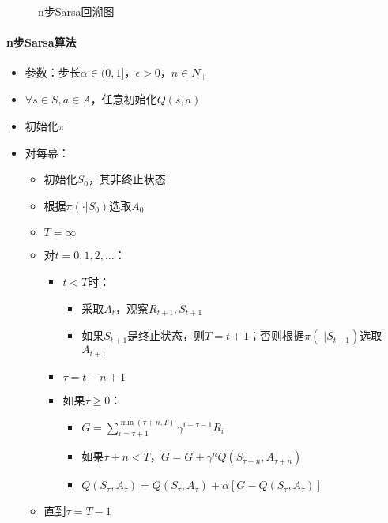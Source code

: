 \documentclass[
12pt, %
a4paper, 
oneside, %
headinclude,footinclude, %
]{scrartcl}
\begin{document}
\begin{figure}[H]
\centering
{} \\
\caption[n步Sarsa回溯图]{n步Sarsa回溯图}
\end{figure}
\paragraph{n步Sarsa算法}
\begin{itemize}
\item 参数：步长$ \alpha \in (0,1] $，$ \epsilon > 0 $，$ n \in N_+ $
\item $ \forall s \in S, a \in A $，任意初始化$ Q(s, a) $
\item 初始化$ \pi $
\item 对每幕：
\begin{itemize}
\item 初始化$ S_0 $，其非终止状态
\item 根据$ \pi(\cdot|S_0) $选取$ A_0 $
\item $ T = \infty $
\item 对$ t = 0, 1, 2, \dots $：
\begin{itemize}
\item $ t < T $时：
\begin{itemize}
\item 采取$ A_t $，观察$ R_{t + 1}, S_{t + 1} $
\item 如果$ S_{t + 1} $是终止状态，则$ T = t + 1 $；否则根据$ \pi(\cdot|S_{t + 1}) $选取$ A_{t + 1} $
\end{itemize}
\item $ \tau = t - n + 1 $
\item 如果$ \tau \geq 0 $：
\begin{itemize}
\item $ G = \sum_{i = \tau + 1}^{\min(\tau + n, T)} \gamma^{i - \tau - 1}R_i $
\item 如果$ \tau + n < T $，$ G = G + \gamma^n Q(S_{\tau + n}, A_{\tau + n}) $
\item $ Q(S_{\tau},A_{\tau}) = Q(S_{\tau},A_{\tau}) + \alpha[G - Q(S_{\tau},A_{\tau})] $
\end{itemize}
\end{itemize}
\item 直到$ \tau = T - 1 $
\end{itemize}
\end{itemize}
\end{document}
